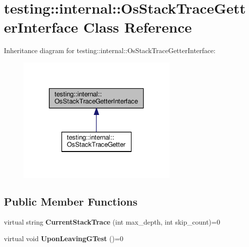 \hypertarget{classtesting_1_1internal_1_1_os_stack_trace_getter_interface}{}\section{testing\+:\+:internal\+:\+:Os\+Stack\+Trace\+Getter\+Interface Class Reference}
\label{classtesting_1_1internal_1_1_os_stack_trace_getter_interface}


Inheritance diagram for testing\+:\+:internal\+:\+:Os\+Stack\+Trace\+Getter\+Interface\+:
\nopagebreak
\begin{figure}[H]
\begin{center}
\leavevmode
\includegraphics[width=225pt]{classtesting_1_1internal_1_1_os_stack_trace_getter_interface__inherit__graph}
\end{center}
\end{figure}
\subsection*{Public Member Functions}
\begin{DoxyCompactItemize}
\item 
\mbox{\label{classtesting_1_1internal_1_1_os_stack_trace_getter_interface_a6965eadb9b340808718fab9f1475c49a}} 
virtual string {\bfseries Current\+Stack\+Trace} (int max\+\_\+depth, int skip\+\_\+count)=0
\item 
\mbox{\label{classtesting_1_1internal_1_1_os_stack_trace_getter_interface_a791bd120428b5a53d5eeba1b27296a39}} 
virtual void {\bfseries Upon\+Leaving\+G\+Test} ()=0
\end{DoxyCompactItemize}
